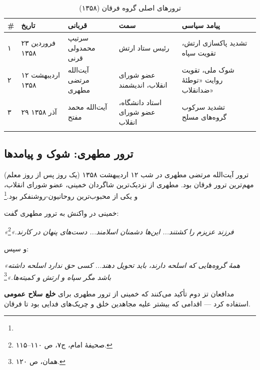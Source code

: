 \documentclass[12pt,a4paper]{book}
\newcommand{\keyword}[1]{\textbf{\textcolor{cPrimary}{#1}}}
\newcommand{\en}[1]{\lr{\textit{#1}}}
\begin{document}
\begin{longtable}{%
    >{\centering\arraybackslash}p{}
    >{\raggedleft\arraybackslash}p{}
    >{\raggedleft\arraybackslash}p{}
    >{\raggedleft\arraybackslash}p{}
    >{\raggedleft\arraybackslash}p{}}
\toprule
\rowcolor{cAccent!10}
\textbf{\#} & \textbf{تاریخ} & \textbf{قربانی} & \textbf{سمت} & \textbf{پیامد سیاسی} \\
\midrule
\endhead

۱ &
۲۳ فروردین ۱۳۵۸ &
سرتیپ محمدولی قرنی &
رئیس ستاد ارتش &
تشدید پاکسازی ارتش، تقویت سپاه \\
\midrule

۲ &
۱۲ اردیبهشت ۱۳۵۸ &
آیت‌الله مرتضی مطهری &
عضو شورای انقلاب، اندیشمند &
شوک ملی، تقویت روایت «توطئهٔ ضدانقلاب» \\
\midrule

۳ &
۲۹ آذر ۱۳۵۸ &
آیت‌الله محمد مفتح &
استاد دانشگاه، عضو شورای انقلاب &
تشدید سرکوب گروه‌های مسلح \\

\bottomrule
\caption{ترورهای اصلی گروه فرقان (۱۳۵۸)}
\label{tab:forqan-assassinations}
\end{longtable}

\subsection{ترور مطهری: شوک و پیامدها}

ترور آیت‌الله مرتضی مطهری در شب ۱۲ اردیبهشت ۱۳۵۸ (یک روز پس از روز معلم) مهم‌ترین ترور فرقان بود. مطهری از نزدیک‌ترین شاگردان خمینی، عضو شورای انقلاب، و یکی از محبوب‌ترین روحانیون-روشنفکر بود.\footnote{\en{Moin (1999), pp.\,214--216.}}

\begin{warningBox}
خمینی در واکنش به ترور مطهری گفت:

\textit{«فرزند عزیزم را کشتند... این‌ها دشمنان اسلامند... دست‌های پنهان در کارند.»}\footnote{صحیفهٔ امام، ج۷، ص ۱۱۰–۱۱۵.}

و سپس:

\textit{«همهٔ گروه‌هایی که اسلحه دارند، باید تحویل دهند... کسی حق ندارد اسلحه داشته باشد مگر سپاه و ارتش و کمیته‌ها.»}\footnote{همان، ص ۱۲۰.}

مدافعان تز دوم تأکید می‌کنند که خمینی از ترور مطهری برای \keyword{خلع سلاح عمومی} استفاده کرد — اقدامی که بیشتر علیه مجاهدین خلق و چریک‌های فدایی بود تا فرقان.
\end{warningBox}
\end{document}
